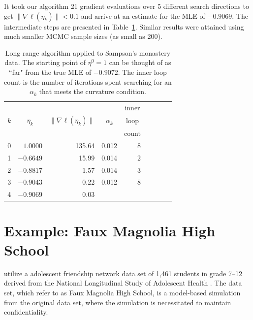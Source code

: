 It took our algorithm 21 gradient evaluations over 5 different search 
directions to get $\lVert \nabla \ell( \eta_k ) \rVert < 0.1$ and arrive at an 
estimate for the MLE of  $-0.9069$.  The intermediate steps are presented in 
Table~\ref{T:Sampson redo}.  Similar results were attained using much smaller 
MCMC sample sizes (as small as 200).

\begin{table}[h!] 
\caption[Long range algorithm applied to Sampson's monastery data]{
Long range algorithm applied to Sampson's 
monastery data.  The starting point of $\eta^0 = 1$ can be thought of as ``far" from the
true MLE of $-0.9072$.  The inner loop count is the number of iterations spent 
searching for an $\alpha_k$ that meets the curvature condition.  
}
\begin{center}
\begin{tabular}{rrrrrrlrr}
  \hline
    &  &  &  & \multicolumn{1}{c}{inner}\\
  \multicolumn{1}{c}{$k$} & 
  \multicolumn{1}{c}{$\eta_k$} &
  \multicolumn{1}{c}{$\lVert \nabla \ell(\eta_k) \rVert$} &
  \multicolumn{1}{c}{$\alpha_k$} &
  \multicolumn{1}{c}{loop }\\
    &  &  &  & \multicolumn{1}{c}{count}\\
  \hline
   0 &  $1.0000$ & 135.64 &  0.012 & 8\\
   1 & $-0.6649$ & 15.99  &  0.014 & 2 \\
   2 & $-0.8817$ & 1.57   &  0.014 & 3 \\
   3 & $-0.9043$ & 0.22   &  0.012 & 8 \\
   4 & $-0.9069$ & 0.03   &  &  \\
   \hline
\end{tabular} \label{T:Sampson redo}
\end{center}
\end{table}


\section{Example: Faux Magnolia High School} \label{S:Example:FauxMagnolia}
\citet{advancesp*,statnet-tutorial} utilize a adolescent friendship network data set 
of 1,461 students in grade 7--12 derived from the National Longitudinal Study of 
Adolescent Health \citep{Resnick:1997}.  The data set, which \citeauthor{statnet-tutorial} refer to as Faux 
Magnolia High School, is a model-based simulation from the original data set, where 
the simulation is necessitated to maintain confidentiality.

